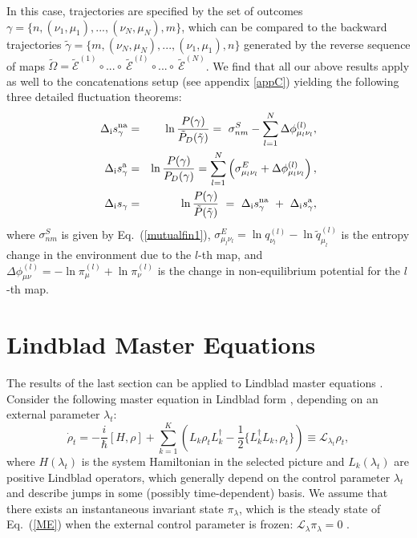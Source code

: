 \documentclass[aps,prx,twocolumn,showpacs,floatfix,superscriptaddress,graphics,longbibliography]{revtex4-1}
\newcommand{\E}{{\mathcal E}}
\newcommand{\HAT}{}
\begin{document}
In this case, trajectories are specified by the set of outcomes $\gamma = \{n , (\nu_1, \mu_1), ..., (\nu_N, \mu_N), m \}$, which can be compared to the backward trajectories 
$\tilde{\gamma} = \{m, (\nu_N, \mu_N), ... , (\nu_1, \mu_1), n \}$ generated by the reverse sequence of maps $\tilde{\Omega} = \tilde{\E}^{(1)} \circ ... \circ~\tilde{\E}^{(l)} \circ ...\circ ~\tilde{\E}^{(N)}$.
We find that all our above results apply as well to the concatenations setup (see appendix \ref{appC}) yielding the following three detailed fluctuation theorems:
\begin{eqnarray} \label{dualr_dft_c}
\Delta_{\rm i} s^{\rm na}_{\gamma} &=& \ln \frac{P(\gamma)}{\tilde{P}_D (\tilde{\gamma})} = ~\sigma_{n m}^S - \sum_{l=1}^N \Delta \phi_{\mu_l \nu_l}^{(l)},  \\ 
\Delta_{\rm i} s^{\rm a}_{\gamma} &=& \ln \frac{P (\gamma)}{P_D (\gamma)} = \sum_{l=1}^N  \left( \sigma^E_{\mu_l \nu_l}  + \Delta \phi_{\mu_l \nu_l}^{(l)} \right),  \\ \label{total_dft_c}
\Delta_{\rm i} s_\gamma &=& \ln \frac{P (\gamma)}{\tilde{P} (\tilde{\gamma})} ~=~ \Delta_{\rm i} s^{\rm na}_{\gamma} ~+~ \Delta_{\rm i} s^{\rm a}_{\gamma},
\end{eqnarray}
where $\sigma_{n m}^S$ is given by Eq.~(\ref{mutualfin1}), $\sigma_{\mu_l\nu_l}^E = \ln q_{\nu_l}^{(l)} - \ln \tilde{q}_{\mu_l}^{(l)}$ is the entropy change in the environment due to the 
$l$-th map, and $\Delta \phi^{(l)}_{\mu \nu} = - \ln \pi_{\mu}^{(l)} + \ln \pi_{\nu}^{(l)}$ is the change in non-equilibrium potential for the $l$-th map.


\section{Lindblad Master Equations}\label{S-MarkovianME}

The results of the last section can be applied to Lindblad master equations \cite{JordanParrondo,JordanSagawa}.
Consider the following master equation in Lindblad form \cite{BreuerBook, Wiseman,Lindblad}, depending on an external parameter $\lambda_t$:
\begin{equation}\label{ME}
\dot{\rho}_t = -\frac{i}{\hbar}[H, \rho] + \sum_{k=1}^K \left( \HAT{L}_k \rho_t \HAT{L}_k^\dagger - \frac{1}{2}\{\HAT{L}_k^\dagger \HAT{L}_k, \rho_t \} \right) \equiv \mathcal{L}_{\lambda_t} \rho_t,
\end{equation} 
where $H(\lambda_t)$ is the system Hamiltonian in the selected picture 
 and 
$\HAT{L}_k(\lambda_t)$ are positive Lindblad operators, which generally  depend on the control parameter $\lambda_t$ and describe jumps in some 
(possibly time-dependent) basis.  We assume that there exists an instantaneous invariant state  $\pi_\lambda$, which is the steady state of Eq.~(\ref{ME}) when the external control parameter is frozen: $\mathcal{L}_\lambda\pi_\lambda = 0$ \cite{Rivas}. 
\end{document}
